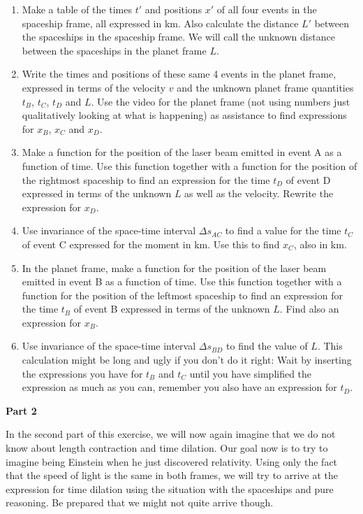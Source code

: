 {\begin{multicols}{2}
\begin{enumerate}
\item Make a table of the times $t'$ and positions $x'$ of all four
events in the spaceship frame, all expressed in km. Also calculate the distance $L'$
between the spaceships in the spaceship frame. We will call the
unknown distance between the spaceships in the planet frame $L$.

\item Write the times and positions of these same 4 events in the
planet frame, expressed in terms of the velocity $v$ and the unknown planet frame
quantities $t_B$, $t_C$, $t_D$ and $L$. Use the video for the
planet frame (not using numbers just qualitatively looking at what is happening) as assistance to find
expressions for $x_B$, $x_C$ and $x_D$.

\item Make a function for the position of the laser beam emitted in event A as a function of time. Use this function together with a function for the position of the rightmost spaceship to find an expression for the time $t_D$ of event D expressed in terms of the unknown $L$ as well as the velocity. Rewrite the expression for $x_D$.

\item Use invariance of the space-time interval $\Delta s_{AC}$ to find a value for the time $t_C$ of event C expressed for the moment in km. Use this to find $x_C$, also in km.

\item  In the planet frame, make a function for the position of the laser beam emitted in event B as a function of time. Use this function together with a function for the position of the leftmost spaceship to find an expression for the time $t_B$ of event B expressed in terms of the unknown $L$. Find also an expression for $x_B$.

\item Use invariance of the space-time interval $\Delta s_{BD}$ to
find the value of $L$. This calculation might be long and ugly if you
don't do it right: Wait by inserting the expressions you have for
$t_B$ and $t_C$ until you have simplified the expression as much as
you can, remember you also have an expression for $t_D$.
\end{enumerate}

\textbf{Part 2}

In the second part of this exercise, we will now again imagine that we
do not know about length contraction and time dilation. Our goal now
is to try to imagine being Einstein when he just discovered
relativity. Using only the fact that the speed of light is the same in
both frames, we will try to arrive at the expression for time dilation
using the situation with the spaceships and pure reasoning. Be
prepared that we might not quite arrive though.


\end{multicols}}
